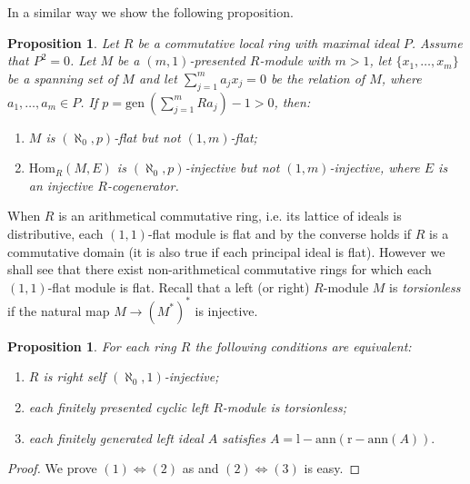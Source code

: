 \documentclass{amsart}
\newtheorem{proposition}[theorem]{Proposition}
\begin{document}
\medskip
In a similar way we show the following proposition.

\begin{proposition}
Let $R$ be a commutative local ring with maximal ideal $P$. Assume that $P^2=0$. Let $M$ be  a $(m,1)$-presented $R$-module with $m>1$, let $\{x_1,\dots,x_m\}$ be a spanning set of $M$ and let $\sum_{j=1}^ma_jx_j=0$ be the relation of $M$, where $a_1,\dots,a_m\in P$.  If $p=\mathrm{gen}\ (\sum_{j=1}^mRa_j)-1>0$, then:
\begin{enumerate}
\item $M$ is $(\aleph_0,p)$-flat but  not $(1,m)$-flat;
\item $\mathrm{Hom}_R(M,E)$ is $(\aleph_0,p)$-injective but not $(1,m)$-injective, where $E$ is an injective $R$-cogenerator.
\end{enumerate}
\end{proposition}


When $R$ is an arithmetical commutative ring, i.e. its lattice of ideals is distributive, each $(1,1)$-flat module is flat and by \cite[Theorem VI.9.10]{FuSa01} the converse holds if $R$ is a commutative domain (it is also true if each principal ideal is flat).  However we shall see that there exist non-arithmetical commutative rings for which each $(1,1)$-flat module is flat. Recall that a left (or right) $R$-module $M$ is {\it torsionless} if the natural map $M\rightarrow (M^*)^*$ is injective.

\begin{proposition}
\label{P:AlephInj} For each ring $R$ the following conditions are equivalent:
\begin{enumerate}
\item $R$ is right self $(\aleph_0,1)$-injective;
\item each finitely presented cyclic left $R$-module is torsionless;
\item each finitely generated left ideal $A$ satisfies $A=\mathrm{l-ann}(\mathrm{r-ann}(A)).$
\end{enumerate}
\end{proposition}
\begin{proof}
We prove $(1)\Leftrightarrow (2)$ as \cite[Theorem 2.3]{Ja73} and $(2)\Leftrightarrow (3)$ is easy.
\end{proof}
\end{document}
